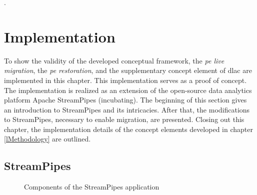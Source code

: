 .
\section{Implementation}
\label{lImplementation}

To show the validity of the developed conceptual framework, the \textit{\acrshort{pe} live migration}, the \textit{\acrshort{pe} restoration}, and the supplementary concept element of \gls{dlac} are implemented in this chapter. This implementation serves as a proof of concept. The implementation is realized as an extension of the open-source data analytics platform Apache StreamPipes (incubating). The beginning of this section gives an introduction to StreamPipes and its intricacies. After that, the modifications to StreamPipes, necessary to enable migration, are presented. Closing out this chapter, the implementation details of the concept elements developed in chapter \ref{lMethodology} are outlined. 

\subsection{StreamPipes}
\label{lStreamPipes}

\begin{figure}[!b]
    \centering
    \graphicspath{{./figures/code/}}
    
    \caption{Components of the StreamPipes application}
    \label{fStreamPipesSetup}
\end{figure}

